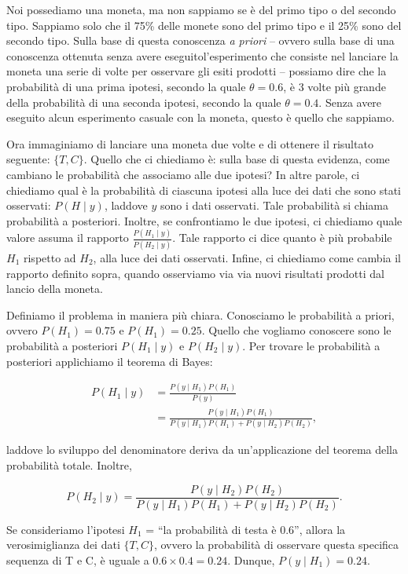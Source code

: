 \documentclass[
  11pt,
]{krantz}
\theoremstyle{definition}
\theoremstyle{definition}
\theoremstyle{definition}
\theoremstyle{definition}
\theoremstyle{remark}
\begin{document}
Noi possediamo una moneta, ma non sappiamo se è del primo tipo o del secondo tipo. Sappiamo solo che il 75\% delle monete sono del primo tipo e il 25\% sono del secondo tipo. Sulla base di questa conoscenza \emph{a priori} -- ovvero sulla base di una conoscenza ottenuta senza avere eseguitol'esperimento che consiste nel lanciare la moneta una serie di volte per osservare gli esiti prodotti -- possiamo dire che la probabilità di una prima ipotesi, secondo la quale \(\theta = 0.6\), è 3 volte più grande della probabilità di una seconda ipotesi, secondo la quale \(\theta = 0.4\). Senza avere eseguito alcun esperimento casuale con la moneta, questo è quello che sappiamo.

Ora immaginiamo di lanciare una moneta due volte e di ottenere il risultato seguente: \(\{T, C\}\). Quello che ci chiediamo è: sulla base di questa evidenza, come cambiano le probabilità che associamo alle due ipotesi? In altre parole, ci chiediamo qual è la probabilità di ciascuna ipotesi alla luce dei dati che sono stati osservati: \(P(H \mid y)\), laddove \(y\) sono i dati osservati. Tale probabilità si chiama probabilità a posteriori. Inoltre, se confrontiamo le due ipotesi, ci chiediamo quale valore assuma il rapporto \(\frac{P(H_1 \mid y)}{P(H_2 \mid y)}\). Tale rapporto ci dice quanto è più probabile \(H_1\) rispetto ad \(H_2\), alla luce dei dati osservati. Infine, ci chiediamo come cambia il rapporto definito sopra, quando osserviamo via via nuovi risultati prodotti dal lancio della moneta.

Definiamo il problema in maniera più chiara. Conosciamo le probabilità a priori, ovvero \(P(H_1) = 0.75\) e \(P(H_1) = 0.25\). Quello che vogliamo conoscere sono le probabilità a posteriori \(P(H_1 \mid y)\) e \(P(H_2 \mid y)\). Per trovare le probabilità a posteriori applichiamo il teorema di Bayes:

\[
\begin{split}
P(H_1 \mid y) &= \frac{P(y \mid H_1) P(H_1)}{P(y)} \\
&= \frac{P(y \mid H_1) P(H_1)}{P(y \mid H_1) P(H_1) + P(y \mid H_2) P(H_2)},
\end{split}
\]

laddove lo sviluppo del denominatore deriva da un'applicazione del teorema della probabilità totale. Inoltre,

\[
P(H_2 \mid y) = \frac{P(y \mid H_2) P(H_2)}{P(y \mid H_1) P(H_1) + P(y \mid H_2) P(H_2)}.
\]

Se consideriamo l'ipotesi \(H_1\) = ``la probabilità di testa è 0.6'', allora la verosimiglianza dei dati \(\{T, C\}\), ovvero la probabilità di osservare questa specifica sequenza di T e C, è uguale a \(0.6 \times 0.4 = 0.24.\) Dunque, \(P(y \mid H_1) = 0.24\).
\end{document}
